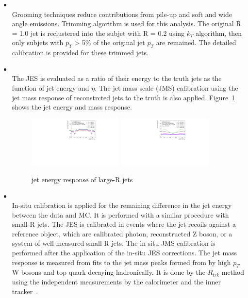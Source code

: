 \begin{itemize}
    \item \textbf{} \\
    Grooming techniques reduce contributions from pile-up and soft and wide angle emissions. 
    Trimming algorithm \cite{Krohn2010} is used for this analysis. 
     The original R = 1.0 jet is reclustered into the subjet with R = 0.2 using $k_T$ algorithm, then only subjets with $p_T$ > 5\% of the original jet $p_T$ are remained.
    The detailed calibration is provided for these trimmed jets.
    \item \textbf{}\\
    The JES is evaluated as a ratio of their energy to the truth jets as the function of jet energy and $\eta$. The jet mass scale (JMS)  calibration using the jet mass response of reconstrcted jets to the truth is also applied.
    Figure~\ref{fig:largeRresponse} shows the jet energy and mass response. 
    \begin{figure}[tbp]
    \begin{center}
    \includegraphics[width=0.45\textwidth,keepaspectratio]{figures/Reconstruction/responsept}
    \includegraphics[width=0.45\textwidth,keepaspectratio]{figures/Reconstruction/responsemass}
    \caption{
    jet energy response of large-R jets \cite{JETM-2018-02}
    }
    \label{fig:largeRresponse}
    \end{center}
    \end{figure} 
    \item  \textbf{} \\
    In-situ calibration is applied for the remaining difference in the jet energy between the data and MC. 
    It is performed with a similar procedure with small-R jets. 
    The JES is calibrated in events where the jet recoils against a reference object, which are calibrated photon, reconstructed Z boson, or a system of well-measured small-R jets. The in-situ JMS calibration is performed after the application of the in-situ JES corrections. The jet mass response is measured from fits to the jet mass peaks formed from by high $p_T$ W bosons and top quark decaying hadronically. 
    It is done by the $R_{trk}$ method using the independent measurements by the calorimeter and the inner tracker~\cite{JETM-2018-02}. 
\end{itemize}


